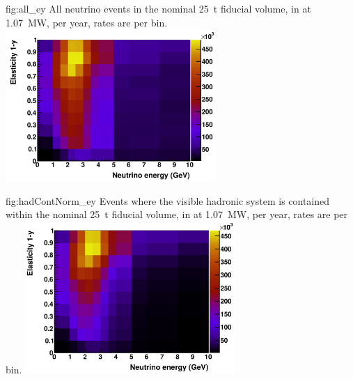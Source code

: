 \begin{dunefigure}{fig:all_ey}
{All neutrino events in the nominal \SI{25}{\tonne} fiducial volume, in  at \SI{1.07}{\mega\watt}, per year, rates are per bin.}
	\includegraphics[width=0.6\textwidth]{graphics/all_ey.png}
\end{dunefigure}

\begin{dunefigure}{fig:hadContNorm_ey}
{Events where the visible hadronic system is contained within the nominal \SI{25}{\tonne} fiducial volume, in  at \SI{1.07}{\mega\watt}, per year, rates are per bin.}
	\includegraphics[width=0.6\textwidth]{graphics/hadContNorm_ey.png}
\end{dunefigure}


